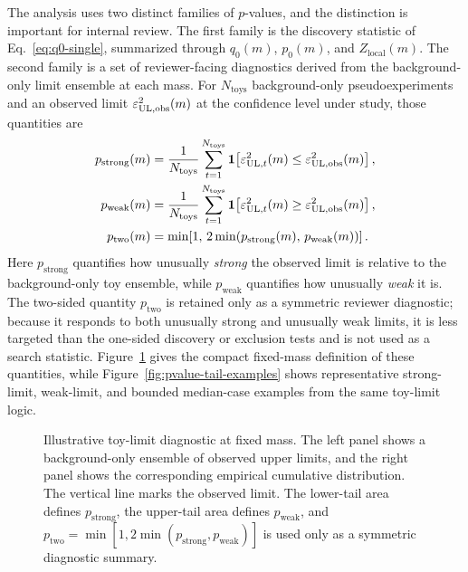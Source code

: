 The analysis uses two distinct families of $p$-values, and the distinction is
important for internal review. The first family is the discovery statistic of
Eq.~\eqref{eq:q0-single}, summarized through $q_0(m)$, $p_0(m)$, and
$Z_{\mathrm{local}}(m)$. The second family is a set of reviewer-facing diagnostics
derived from the background-only \CLs{} limit ensemble at each mass. For
$N_{\mathrm{toys}}$ background-only pseudoexperiments and an observed limit
$\varepsilon^2_{\mathrm{UL},\mathrm{obs}}(m)$ at the confidence level under study, those
quantities are
\begin{align}
p_{\mathrm{strong}}(m)
&=
\frac{1}{N_{\mathrm{toys}}}
\sum_{t=1}^{N_{\mathrm{toys}}}
\mathbf{1}\!\left[
\varepsilon^2_{\mathrm{UL},t}(m)\le \varepsilon^2_{\mathrm{UL},\mathrm{obs}}(m)
\right], \\
p_{\mathrm{weak}}(m)
&=
\frac{1}{N_{\mathrm{toys}}}
\sum_{t=1}^{N_{\mathrm{toys}}}
\mathbf{1}\!\left[
\varepsilon^2_{\mathrm{UL},t}(m)\ge \varepsilon^2_{\mathrm{UL},\mathrm{obs}}(m)
\right], \\
p_{\mathrm{two}}(m)
&=
\min\!\left[1,\,
2\min\!\left(p_{\mathrm{strong}}(m),\,p_{\mathrm{weak}}(m)\right)\right].
\end{align}
Here $p_{\mathrm{strong}}$ quantifies how unusually \emph{strong} the observed limit
is relative to the background-only toy ensemble, while $p_{\mathrm{weak}}$ quantifies
how unusually \emph{weak} it is. The two-sided quantity $p_{\mathrm{two}}$ is retained
only as a symmetric reviewer diagnostic; because it responds to both unusually strong
and unusually weak limits, it is less targeted than the one-sided discovery or
exclusion tests and is not used as a search statistic. Figure~\ref{fig:pvalue-tail-schematic}
gives the compact fixed-mass definition of these quantities, while
Figure~\ref{fig:pvalue-tail-examples} shows representative strong-limit, weak-limit,
and bounded median-case examples from the same toy-limit logic.

\begin{figure}[H]
\centering
{}
\caption{Illustrative toy-limit diagnostic at fixed mass. The left panel shows a
background-only ensemble of observed \CLs{} upper limits, and the right panel shows the
corresponding empirical cumulative distribution. The vertical line marks the observed
limit. The lower-tail area defines $p_{\mathrm{strong}}$, the upper-tail area defines
$p_{\mathrm{weak}}$, and
$p_{\mathrm{two}}=\min[1,2\min(p_{\mathrm{strong}},p_{\mathrm{weak}})]$ is used only
as a symmetric diagnostic summary.}
\label{fig:pvalue-tail-schematic}
\end{figure}

